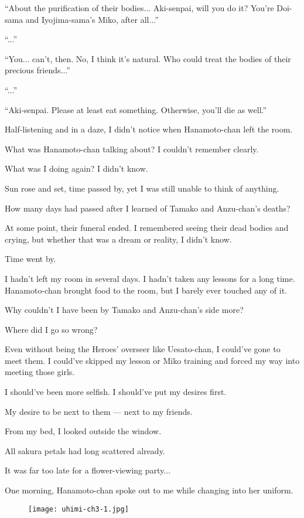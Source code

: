 ``About the purification of their bodies... Aki-senpai, will you do it? You're Doi-sama and Iyojima-sama's Miko, after all...''

``...''

``You... can't, then. No, I think it's natural. Who could treat the bodies of their precious friends...''

``...''

``Aki-senpai. Please at least eat something. Otherwise, you'll die as well.''

Half-listening and in a daze, I didn't notice when Hanamoto-chan left the room.

What was Hanamoto-chan talking about? I couldn't remember clearly.

What was I doing again? I didn't know.

Sun rose and set, time passed by, yet I was still unable to think of anything.

How many days had passed after I learned of Tamako and Anzu-chan's deaths?

At some point, their funeral ended. I remembered seeing their dead bodies and crying, but whether that was a dream or reality, I didn't know.

Time went by.

I hadn't left my room in several days. I hadn't taken any lessons for a long time. Hanamoto-chan brought food to the room, but I barely ever touched any of it.

Why couldn't I have been by Tamako and Anzu-chan's side more?

Where did I go so wrong?

Even without being the Heroes' overseer like Uesato-chan, I could've gone to meet them. I could've skipped my lesson or Miko training and forced my way into meeting those girls.

I should've been more selfish. I should've put my desires first.

My desire to be next to them --- next to my friends.

From my bed, I looked outside the window.

All sakura petals had long scattered already.

It was far too late for a flower-viewing party...

One morning, Hanamoto-chan spoke out to me while changing into her uniform.

\begin{figure}[p]
\texttt{[image: uhimi-ch3-1.jpg]}
\end{figure}

